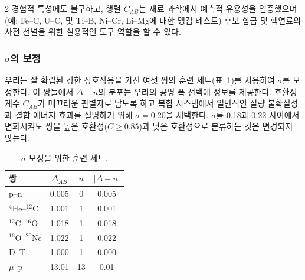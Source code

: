 \documentclass[11pt,a4paper]{article}
\begin{document}
\begin{multicols}{2}
		경험적 특성에도 불구하고, 행렬 \(C_{AB}\)는 재료 과학에서 예측적 유용성을 입증했으며(예: Fe–C, U–C, 및 Ti–B, Ni–Cr, Li–Mg에 대한 맹검 테스트) 후보 합금 및 핵연료의 사전 선별을 위한 실용적인 도구 역할을 할 수 있다.
		
		\subsubsection{\(\sigma\)의 보정}
		
		우리는 잘 확립된 강한 상호작용을 가진 여섯 쌍의 훈련 세트(표~\ref{tab:calibration})를 사용하여 \(\sigma\)를 보정한다. 이 쌍들에서 \(\Delta - n\)의 분포는 우리의 공명 폭 선택에 정보를 제공한다. 호환성 계수 \(C_{AB}\)가 매끄러운 판별자로 남도록 하고 복합 시스템에서 일반적인 질량 불확실성과 결합 에너지 효과를 설명하기 위해 \(\sigma = 0.20\)을 채택한다. \(\sigma\)를 0.18과 0.22 사이에서 변화시켜도 쌍을 높은 호환성(\(C \ge 0.85\))과 낮은 호환성으로 분류하는 것은 변경되지 않는다.
		
		\begin{table}[H]
			\centering
			\caption{\(\sigma\) 보정을 위한 훈련 세트.}
			\label{tab:calibration}
			\small
			\begin{tabular}{l c c c}
				\toprule
				쌍 & \(\Delta_{AB}\) & \(n\) & \(|\Delta - n|\) \\
				\midrule
				p--n    & 0.005 & 0 & 0.005 \\
				\(^4\)He--\(^{12}\)C & 1.001 & 1 & 0.001 \\
				\(^{12}\)C--\(^{16}\)O & 1.018 & 1 & 0.018 \\
				\(^{16}\)O--\(^{20}\)Ne & 1.022 & 1 & 0.022 \\
				D--T    & 1.000 & 1 & 0.000 \\
				\(\mu\)--p & 13.01 & 13 & 0.01 \\
				\bottomrule
			\end{tabular}
		\end{table}
		
	\end{multicols}
	
\end{document}
